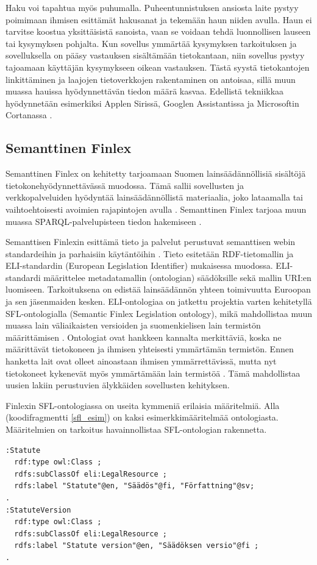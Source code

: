 \documentclass[finnish, 12pt, a4paper, elec, utf8, pdfa, online]{aaltothesis}
\begin{document}
{Haku voi tapahtua myös puhumalla. Puheentunnistuksen ansiosta laite pystyy poimimaan ihmisen esittämät hakusanat ja tekemään haun niiden avulla. Haun ei tarvitse koostua yksittäisistä sanoista, vaan se voidaan tehdä luonnollisen lauseen tai kysymyksen pohjalta. Kun sovellus ymmärtää kysymyksen tarkoituksen ja sovelluksella on pääsy vastauksen sisältämään tietokantaan, niin sovellus pystyy tajoamaan käyttäjän kysymykseen oikean vastauksen. Tästä syystä tietokantojen linkittäminen ja laajojen tietoverkkojen rakentaminen on antoisaa, sillä muun muassa hauissa hyödynnettävän tiedon määrä kasvaa. Edellistä tekniikkaa hyödynnetään esimerkiksi Applen Sirissä, Googlen Assistantissa ja Microsoftin Cortanassa \cite{siri} \cite{assistant} \cite{cortana}.

\subsection{Semanttinen Finlex}
Semanttinen Finlex on kehitetty tarjoamaan Suomen lainsäädännöllisiä sisältöjä tietokonehyödynnettävässä muodossa. Tämä sallii sovellusten ja verkkopalveluiden hyödyntää lainsäädännöllistä materiaalia, joko lataamalla tai vaihtoehtoisesti avoimien rajapintojen avulla \cite{finlex}. Semanttinen Finlex tarjoaa muun muassa SPARQL-palvelupisteen tiedon hakemiseen \cite{finlex2}.

Semanttisen Finlexin esittämä tieto ja palvelut perustuvat semanttisen webin standardeihin ja parhaisiin käytäntöihin \cite{finlex2}. Tieto esitetään RDF-tietomallin ja ELI-standardin (European Legislation Identifier) mukaisessa muodossa. ELI-standardi määrittelee metadatamallin (ontologian) säädöksille sekä mallin URI:en luomiseen. Tarkoituksena on edistää lainsäädännön yhteen toimivuutta Euroopan ja sen jäsenmaiden kesken. ELI-ontologiaa on jatkettu projektia varten kehitetyllä SFL-ontologialla (Semantic Finlex Legislation ontology), mikä mahdollistaa muun muassa lain väliaikaisten versioiden ja suomenkielisen lain termistön määrittämisen \cite{finlex3}. Ontologiat ovat hankkeen kannalta merkittäviä, koska ne määrittävät tietokoneen ja ihmisen yhteisesti ymmärtämän termistön. Ennen hanketta lait ovat olleet ainoastaan ihmisen ymmärrettävissä, mutta nyt tietokoneet kykenevät myös ymmärtämään lain termistöä \cite{finlex}. Tämä mahdollistaa uusien lakiin perustuvien älykkäiden sovellusten kehityksen.

Finlexin SFL-ontologiassa on useita kymmeniä erilaisia määritelmiä. Alla (koodifragmentti \ref{sfl_esim}) on kaksi esimerkkimääritelmää ontologiasta. Määritelmien on tarkoitus havainnollistaa SFL-ontologian rakennetta.
\vskip 0.5cm
\begin{lstlisting}[style=codeblock,caption={SFL-ontologia esimerkki.},captionpos=b,label={sfl_esim}]
:Statute
  rdf:type owl:Class ;
  rdfs:subClassOf eli:LegalResource ;
  rdfs:label "Statute"@en, "Säädös"@fi, "Författning"@sv;
.
:StatuteVersion
  rdf:type owl:Class ;
  rdfs:subClassOf eli:LegalResource ;
  rdfs:label "Statute version"@en, "Säädöksen versio"@fi ;
.
\end{lstlisting}
\clearpage

}
\end{document}
